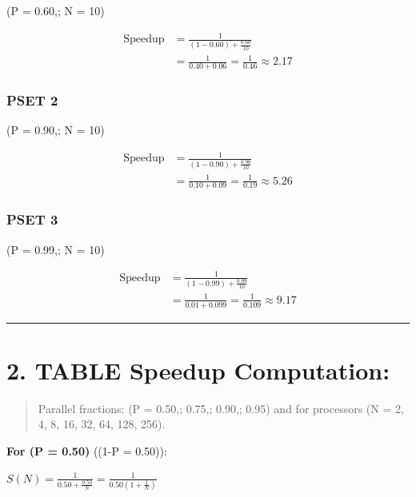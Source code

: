 \documentclass[11pt]{article}
\begin{document}
(P = 0.60,; N = 10)

\[
\begin{aligned}
\text{Speedup} &= \frac{1}{(1-0.60) + \frac{0.60}{10}} \\
&= \frac{1}{0.40 + 0.06} = \frac{1}{0.46} \approx 2.17
\end{aligned}
\]

\subsubsection{PSET 2}\label{pset-2}

(P = 0.90,; N = 10)

\[
\begin{aligned}
\text{Speedup} &= \frac{1}{(1-0.90) + \frac{0.90}{10}} \\
&= \frac{1}{0.10 + 0.09} = \frac{1}{0.19} \approx 5.26
\end{aligned}
\]

\subsubsection{PSET 3}\label{pset-3}

(P = 0.99,; N = 10)

\[
\begin{aligned}
\text{Speedup} &= \frac{1}{(1-0.99) + \frac{0.99}{10}} \\
&= \frac{1}{0.01 + 0.099} = \frac{1}{0.109} \approx 9.17
\end{aligned}
\]

\begin{center}\rule{0.5\linewidth}{0.5pt}\end{center}

    \section{2. TABLE Speedup Computation:}\label{table-speedup-computation}

\begin{quote}
Parallel fractions: (P = 0.50,; 0.75,; 0.90,; 0.95) and for processors
(N = 2, 4, 8, 16, 32, 64, 128, 256).
\end{quote}

\textbf{For (P = 0.50)} ((1-P = 0.50)):

\(S(N) = \frac{1}{0.50 + \frac{0.50}{N}} = \frac{1}{0.50\left(1 + \frac{1}{N}\right)}\)
\end{document}
